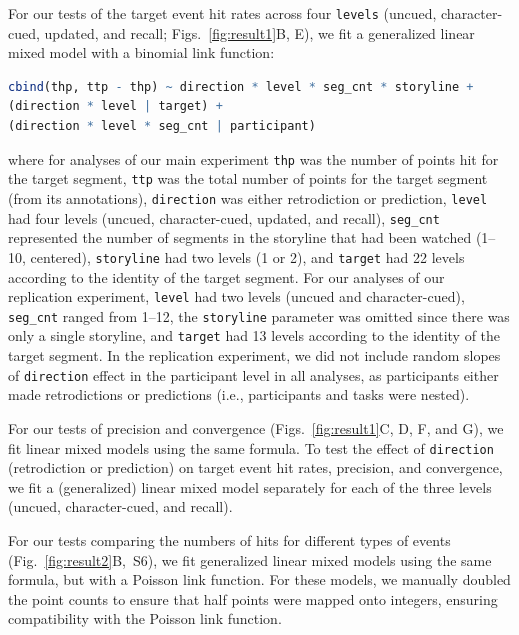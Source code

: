 \documentclass[10pt]{article}
\newcommand{\hitRates}{S6}
\begin{document}
For our tests of the target event hit rates across four \texttt{levels} (uncued, character-cued, updated, and recall; Figs.~\ref{fig:result1}B, E), we fit a generalized linear mixed model with a binomial link function:
\begin{lstlisting}[language=R]
  cbind(thp, ttp - thp) ~ direction * level * seg_cnt * storyline +
(direction * level | target) +
(direction * level * seg_cnt | participant)
\end{lstlisting}
where for analyses of our main experiment \texttt{thp} was the number of points hit for the target segment, \texttt{ttp} was the total number of points for the target segment (from its annotations), \texttt{direction} was either retrodiction or prediction, \texttt{level} had four levels (uncued, character-cued, updated, and recall), \texttt{seg\_cnt} represented the number of segments in the storyline that had been watched (1--10, centered), \texttt{storyline} had two levels (1 or 2), and \texttt{target} had 22 levels according to the identity of the target segment. For our analyses of our replication experiment, \texttt{level} had two levels (uncued and character-cued), \texttt{seg\_cnt} ranged from 1--12, the \texttt{storyline} parameter was omitted since there was only a single storyline, and \texttt{target} had 13 levels according to the identity of the target segment. In the replication experiment, we did not include random slopes of \texttt{direction} effect in the participant level in all analyses, as participants either made retrodictions or predictions (i.e., participants and tasks were nested).

For our tests of precision and convergence (Figs.~\ref{fig:result1}C, D, F, and G), we fit linear mixed models using the same formula. To test the effect of \texttt{direction} (retrodiction or prediction) on target event hit rates, precision, and convergence, we fit a (generalized) linear mixed model separately for each of the three levels (uncued, character-cued, and recall).

For our tests comparing the numbers of hits for different types of events (Fig.~\ref{fig:result2}B,~\hitRates), we fit generalized linear mixed models using the same formula, but with a Poisson link function. For these models, we manually doubled the point counts to ensure that half points were mapped onto integers, ensuring compatibility with the Poisson link function.
\end{document}
